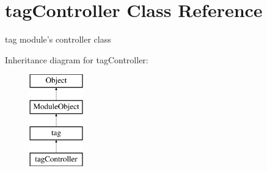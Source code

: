 \hypertarget{classtagController}{\section{tag\+Controller Class Reference}
\label{classtagController}
}


tag module's controller class  


Inheritance diagram for tag\+Controller\+:\begin{figure}[H]
\begin{center}
\leavevmode
\includegraphics[height=4.000000cm]{classtagController}
\end{center}
\end{figure}
